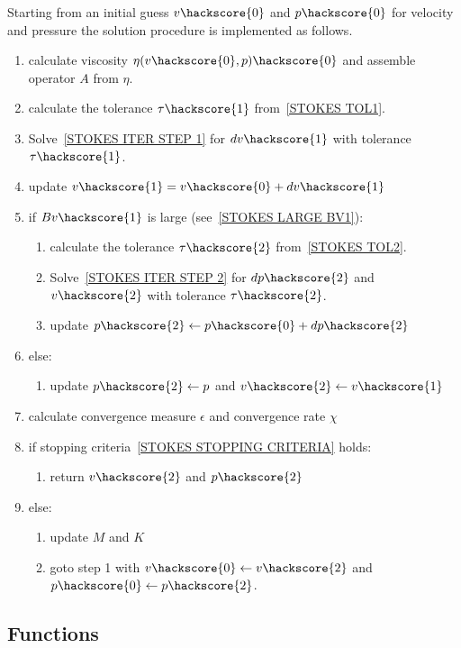 Starting from an initial guess $v\hackscore{0}$ and $p\hackscore{0}$ for velocity and pressure
the solution procedure is implemented as follows.
\begin{enumerate}
 \item calculate viscosity $\eta(v\hackscore{0},p)\hackscore{0}$ and assemble operator $A$ from $\eta$.
 \item calculate the tolerance $\tau\hackscore{1}$ from~\ref{STOKES TOL1}.
 \item Solve~\ref{STOKES ITER STEP 1} for $dv\hackscore{1}$ with tolerance $\tau\hackscore{1}$.
 \item update $v\hackscore{1}= v\hackscore{0}+ dv\hackscore{1}$
 \item if $Bv\hackscore{1}$ is large (see~\ref{STOKES LARGE BV1}):
 \begin{enumerate}
 \item calculate the tolerance $\tau\hackscore{2}$ from~\ref{STOKES TOL2}.
 \item Solve~\ref{STOKES ITER STEP 2} for $dp\hackscore{2}$ and $v\hackscore{2}$ with tolerance $\tau\hackscore{2}$.
 \item update $p\hackscore{2}\leftarrow p\hackscore{0}+ dp\hackscore{2}$
 \end{enumerate}
 \item else:
  \begin{enumerate}
  \item update $p\hackscore{2}\leftarrow p$ and $v\hackscore{2}\leftarrow v\hackscore{1}$
   \end{enumerate}
   \item calculate convergence measure $\epsilon$ and convergence rate $\chi$
\item if stopping criteria~\ref{STOKES STOPPING CRITERIA} holds:
 \begin{enumerate}
 \item return $v\hackscore{2}$ and $p\hackscore{2}$
 \end{enumerate}
 \item else:
 \begin{enumerate}

     \item update $M$ and $K$
     \item goto step 1 with $v\hackscore{0}\leftarrow v\hackscore{2}$ and $p\hackscore{0}\leftarrow p\hackscore{2}$.
\end{enumerate}
\end{enumerate}

\subsection{Functions}

